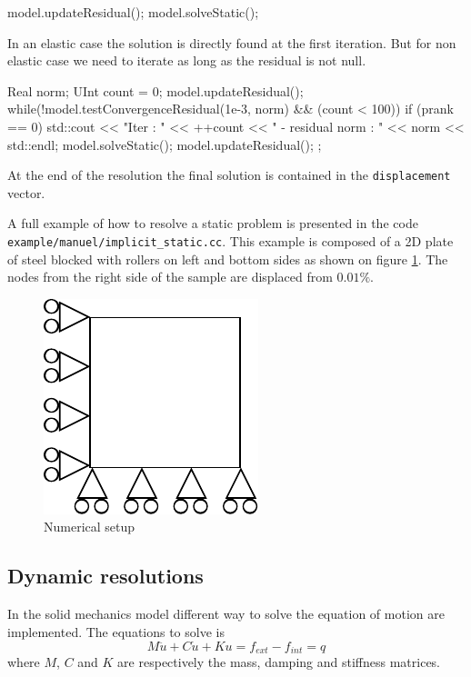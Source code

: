 \documentclass[a4paper,11pt]{book}
\newcommand{\code}[1]{{\tt{#1}}}
\begin{document}
\begin{cpp}
  model.updateResidual();
  model.solveStatic();
\end{cpp}

In an  elastic case the solution is  directly found at the  first iteration. But
for non elastic case we need to iterate as long as the residual is not null.
\begin{cpp}
  Real norm;
  UInt count = 0;
  model.updateResidual();
  while(!model.testConvergenceResidual(1e-3, norm) && (count < 100)) {
    if (prank == 0)
      std::cout << "Iter : " << ++count
                << " - residual norm : "
                << norm << std::endl;
    model.solveStatic();
    model.updateResidual();
  };
\end{cpp}

At  the  end  of  the  resolution   the  final  solution  is  contained  in  the
\code{displacement} vector.

A full  example of  how to  resolve a static  problem is  presented in  the code
\code{example/manuel/implicit\_static.cc}.  This  example is  composed  of a  2D
plate of steel blocked with rollers on  left and bottom sides as shown on figure
\ref{fig:smm:static}. The nodes from the  right side of the sample are displaced
from $0.01\%$.

\begin{figure}[!htb]
  \centering
  \includegraphics{figures/implicit_static}
  \caption{Numerical setup\label{fig:smm:static}}
\end{figure}


\subsection{Dynamic resolutions}

In the solid mechanics model different way to solve the equation of motion are
implemented.  The equations to solve is
\begin{equation}\label{eqn:equation-motion}
M\ddot{u} + C\dot{u} + Ku = f_{ext} -f_{int} = q
\end{equation}
where  $M$,  $C$  and $K$  are  respectively  the  mass, damping  and  stiffness
matrices.
\end{document}
